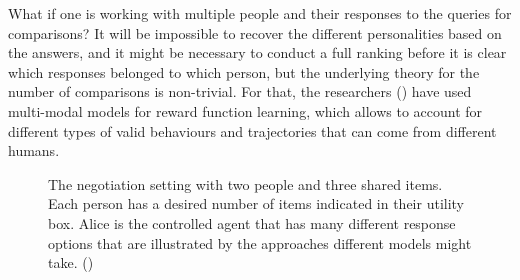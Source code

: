 \documentclass[
  letterpaper,
  numbers=noenddot,
  DIV=11]{scrreprt}
\theoremstyle{definition}
\theoremstyle{plain}
\theoremstyle{plain}
\theoremstyle{remark}
\begin{document}
What if one is working with multiple people and their responses to the
queries for comparisons? It will be impossible to recover the different
personalities based on the answers, and it might be necessary to conduct
a full ranking before it is clear which responses belonged to which
person, but the underlying theory for the number of comparisons is
non-trivial. For that, the researchers
() have used
multi-modal models for reward function learning, which allows to account
for different types of valid behaviours and trajectories that can come
from different humans.

\begin{figure}


\caption{\label{fig-negotiation}The negotiation setting with two people
and three shared items. Each person has a desired number of items
indicated in their utility box. Alice is the controlled agent that has
many different response options that are illustrated by the approaches
different models might take. ()}

\end{figure}%
\end{document}
